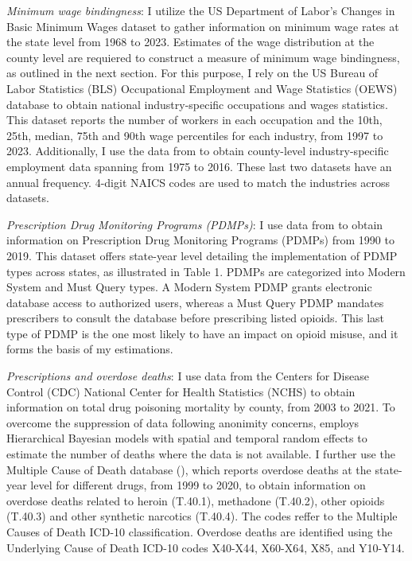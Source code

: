 \documentclass[12pt,a4paper]{article}
\begin{document}
\textit{Minimum wage bindingness}: 
I utilize the US Department of Labor's Changes in Basic Minimum Wages dataset to gather information on minimum wage rates at the state level from 1968 to 2023.
Estimates of the wage distribution at the county level are requiered to construct a measure of minimum wage bindingness, as outlined in the next section.
For this purpose, I rely on the US Bureau of Labor Statistics (BLS) Occupational Employment and Wage Statistics (OEWS) database to obtain national industry-specific occupations and wages statistics.
This dataset reports the number of workers in each occupation and the 10th, 25th, median, 75th and 90th wage percentiles for each industry, from 1997 to 2023.
Additionally, I use the data from \textcite{Eckert2020} to obtain county-level industry-specific employment data spanning from 1975 to 2016.
These last two datasets have an annual frequency. 4-digit NAICS codes are used to match the industries across datasets.

\textit{Prescription Drug Monitoring Programs (PDMPs)}: 
I use data from \textcite{Horwitz2021} to obtain information on Prescription Drug Monitoring Programs (PDMPs) from 1990 to 2019.
This dataset offers state-year level detailing the implementation of PDMP types across states, as illustrated in Table 1. 
PDMPs are categorized into Modern System and Must Query types. 
A Modern System PDMP grants electronic database access to authorized users, whereas a Must Query PDMP mandates prescribers to consult the database before prescribing listed opioids. 
This last type of PDMP is the one most likely to have an impact on opioid misuse, and it forms the basis of my estimations.

\textit{Prescriptions and overdose deaths}: 
I use data from the Centers for Disease Control (CDC) National Center for Health Statistics (NCHS) to obtain information on total drug poisoning mortality by county, from 2003 to 2021.
To overcome the suppression of data following anonimity concerns, \textcite{CLMort} employs Hierarchical Bayesian models with spatial and temporal random effects to estimate the number of deaths where the data is not available.
I further use the Multiple Cause of Death database (\cite{CDCMCD9920}), which reports overdose deaths at the state-year level for different drugs, from 1999 to 2020, to obtain information on overdose deaths related to heroin (T.40.1), methadone (T.40.2), other opioids (T.40.3) and other synthetic narcotics (T.40.4).
The codes reffer to the Multiple Causes of Death ICD-10 classification. 
Overdose deaths are identified using the Underlying Cause of Death ICD-10 codes X40-X44, X60-X64, X85, and Y10-Y14.
\end{document}

